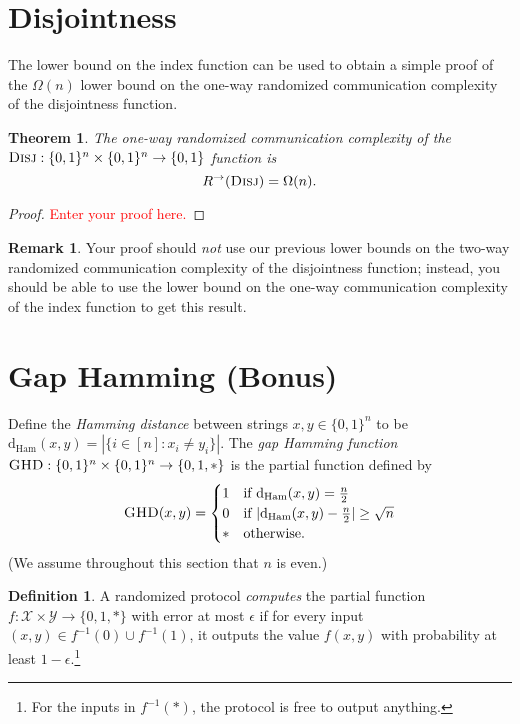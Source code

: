 \documentclass[11pt]{amsart}
\theoremstyle{plain}
\newtheorem{theorem}{Theorem}
\theoremstyle{definition}
\newtheorem{definition}{Definition}
\newtheorem{remark}{Remark}
\theoremstyle{plain}
\newcommand{\calX}{\mathcal{X}}
\newcommand{\calY}{\mathcal{Y}}
\newcommand{\dHam}{\mathrm{d}_{\mathrm{Ham}}}
\newcommand{\Disj}{\textsc{Disj}}
\newcommand{\GHD}{\textsc{GHD}}
\newcommand{\replacethistext}[1]{\textcolor{red}{#1}}
\begin{document}
\newpage 
\section{Disjointness}

The lower bound on the index function can be used to obtain a simple proof of the $\Omega(n)$ lower bound on the one-way randomized communication complexity of the disjointness function.

\begin{theorem}
The one-way randomized communication complexity of the $\Disj : \{0,1\}^n \times \{0,1\}^n \to \{0,1\}$ function is
\[
R^\rightarrow(\Disj) = \Omega(n).
\]
\end{theorem}

\begin{proof}
\replacethistext{Enter your proof here.}
\end{proof}

\begin{remark}
Your proof should \emph{not} use our previous lower bounds on the two-way randomized communication complexity of the disjointness function; instead, you should be able to use the lower bound on the one-way communication complexity of the index function to get this result.
\end{remark}



\newpage 
\section{Gap Hamming (Bonus)}

Define the \emph{Hamming distance} between strings $x,y \in \{0,1\}^n$ to be $\dHam(x,y) = |\{i \in [n] : x_i \neq y_i\}|$.
The \emph{gap Hamming function} $\GHD : \{0,1\}^n \times \{0,1\}^n \to \{0,1,*\}$ is the partial function defined by
\[
\GHD(x,y) = \begin{cases}
1 & \mbox{if } \dHam(x,y) = \frac n2 \\
0 & \mbox{if } |\dHam(x,y) - \frac n2| \ge \sqrt{n} \\
* & \mbox{otherwise.}
\end{cases}
\] 
(We assume throughout this section that $n$ is even.)

\begin{definition}
A randomized protocol \emph{computes} the partial function $f : \calX \times \calY \to \{0,1,*\}$ with error at most $\epsilon$ if for every input $(x,y) \in f^{-1}(0) \cup f^{-1}(1)$, it outputs the value $f(x,y)$ with probability at least $1-\epsilon$.\footnote{For the inputs in $f^{-1}(*)$, the protocol is free to output anything.}
\end{definition}
\end{document}
